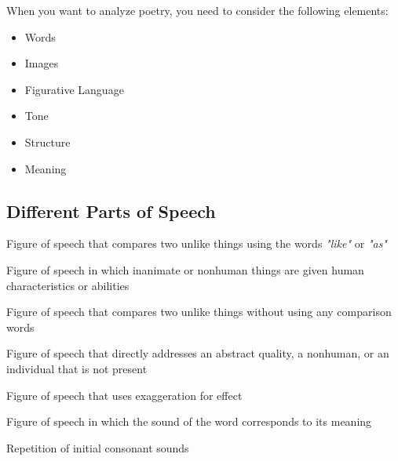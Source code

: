 
When you want to analyze poetry, you need to consider the following elements:

\begin{itemize}
  \item Words
  \item Images
  \item Figurative Language
  \item Tone
  \item Structure
  \item Meaning
\end{itemize}

\subsection*{Different Parts of Speech}
\label{sub_sec:different_parts_of_speech}

\begin{definition}[Simile]
  Figure of speech that compares two unlike things using
  the words \textit{"like"} or \textit{"as"}
\end{definition}

\begin{definition}[Personification]
  Figure of speech in which inanimate or
  nonhuman things are given human characteristics or abilities
\end{definition}
\begin{definition}[Metaphor]
  Figure of speech that compares two unlike things without using any comparison
  words
\end{definition}

\begin{definition}[Apostrophe]
  Figure of speech that directly addresses an abstract quality, a nonhuman, or
  an individual that is not present
\end{definition}

\begin{definition}[Hyperbole]
  Figure of speech that uses exaggeration for effect
\end{definition}

\begin{definition}[Onomatopeia]
  Figure of speech in which the sound of the word corresponds to its meaning
\end{definition}

\begin{definition}[Alliteration]
  Repetition of initial consonant sounds
\end{definition}

